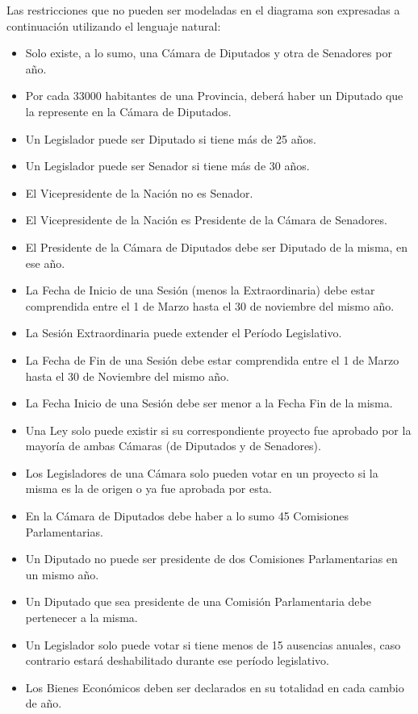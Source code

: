 Las restricciones que no pueden ser modeladas en el diagrama son expresadas a continuación utilizando el lenguaje natural:
\begin{itemize}
	\item Solo existe, a lo sumo, una Cámara de Diputados y otra de Senadores por año. 
	\item Por cada 33000 habitantes de una Provincia, deberá haber un Diputado que la represente en la Cámara de Diputados. 
	\item Un Legislador puede ser Diputado si tiene más de 25 años.
	\item Un Legislador puede ser Senador si tiene más de 30 años.
	\item El Vicepresidente de la Nación no es Senador.
	\item El Vicepresidente de la Nación es Presidente de la Cámara de Senadores. 
	\item El Presidente de la Cámara de Diputados debe ser Diputado de la misma, en ese año. 
	\item La Fecha de Inicio de una Sesión (menos la Extraordinaria) debe estar comprendida entre el 1 de Marzo hasta el 30 de noviembre del mismo año.	
	\item La Sesión Extraordinaria puede extender el Período Legislativo. 
	\item La Fecha de Fin de una Sesión debe estar comprendida entre el 1 de Marzo hasta el 30 de Noviembre del mismo año.
	\item La Fecha Inicio de una Sesión debe ser menor a la Fecha Fin de la misma. 
	\item Una Ley solo puede existir si su correspondiente proyecto fue aprobado por la mayoría de ambas Cámaras (de Diputados y de Senadores).
	\item Los Legisladores de una Cámara solo pueden votar en un proyecto si la misma es la de origen o ya fue aprobada por esta.
	\item En la Cámara de Diputados debe haber a lo sumo 45 Comisiones Parlamentarias.
	\item Un Diputado no puede ser presidente de dos Comisiones Parlamentarias en un mismo año.
	\item Un Diputado que sea presidente de una Comisión Parlamentaria debe pertenecer a la misma. 
	\item Un Legislador solo puede votar si tiene menos de 15 ausencias anuales, caso contrario estará deshabilitado durante ese período legislativo.
	\item Los Bienes Económicos deben ser declarados en su totalidad en cada cambio de año.

\end{itemize}
